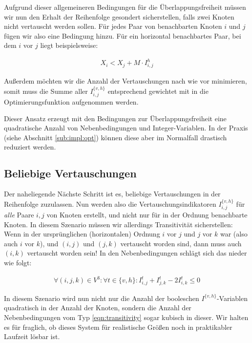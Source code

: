 Aufgrund dieser allgemeineren Bedingungen für die Überlappungsfreiheit müssen wir nun den Erhalt der Reihenfolge gesondert sicherstellen, falls zwei Knoten nicht vertauscht werden sollen. Für jedes Paar von benachbarten Knoten $i$ und $j$ fügen wir also eine Bedingung hinzu. Für ein horizontal benachbartes Paar, bei dem $i$ vor $j$ liegt beispielsweise:

\begin{align}
	X_i < X_j + M \cdot I^{h}_{i,j}
\end{align}

Außerdem möchten wir die Anzahl der Vertauschungen nach wie vor minimieren, somit muss die Summe aller $I^{\{v,h\}}_{i,j}$ entsprechend gewichtet mit in die Optimierungsfunktion aufgenommen werden.

Dieser Ansatz erzeugt mit den Bedingungen zur Überlappungsfreiheit eine quadratische Anzahl von Nebenbedingungen und Integer-Variablen. In der Praxis (siehe Abschnitt \ref{sub:impl:opt}) können diese aber im Normalfall drastisch reduziert werden.

\subsection{Beliebige Vertauschungen}

Der naheliegende Nächste Schritt ist es, beliebige Vertauschungen in der Reihenfolge zuzulassen. Nun werden also die Vertauschungsindikatoren $I^{\{v,h\}}_{i,j}$ für \textit{alle} Paare $i,j$ von Knoten erstellt, und nicht nur für in der Ordnung benachbarte Knoten. In diesem Szenario müssen wir allerdings Transitivität sicherstellen: Wenn in der ursprünglichen (horizontalen) Ordnung $i$ vor $j$ und $j$ vor $k$ war (also auch $i$ vor $k$), und $(i,j)$ und $(j,k)$ vertauscht worden sind, dann muss auch $(i,k)$ vertauscht worden sein! In den Nebenbedingungen schlägt sich das nieder wie folgt:

\begin{align}
	\forall (i,j,k) \in V^3 : \forall t \in \{v,h\} :  I^{t}_{i,j} + I^{t}_{j,k} - 2 I^{t}_{i,k} \leq 0 \label{eqn:transitivity}
\end{align}

In diesem Szenario wird nun nicht nur die Anzahl der booleschen $I^{\{v,h\}}$-Variablen quadratisch in der Anzahl der Knoten, sondern die Anzahl der Nebenbedingungen vom Typ \ref{eqn:transitivity} sogar kubisch in dieser. Wir halten es für fraglich, ob dieses System für realistische Größen noch in praktikabler Laufzeit lösbar ist.

